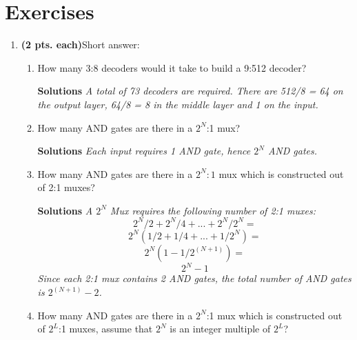 \section{Exercises}
\label{section:comboBbExercises}
\graphicspath{ {./chapter04/FigHw} }

\begin{enumerate}
    \item \textbf{(2 pts. each)}Short answer:
        \begin{enumerate}
            \item How many 3:8 decoders would it take to build a 9:512 decoder?

                \begin{onlysolution} \textbf{Solutions} \itshape{A total of 73 decoders are required.  There
                        are 512/8 = 64 on
                    the output layer, 64/8 = 8 in the middle layer and 1 on the input.}
                \end{onlysolution}
            \item How many AND gates are there in a $2^N$:1 mux?

                \begin{onlysolution} \textbf{Solutions} \itshape{ Each input requires 1 AND gate, hence $2^N$
                    AND gates.}
                \end{onlysolution}
            \item How many AND gates are there in a $2^N:1$ mux which is
                constructed out of 2:1 muxes?

                \begin{onlysolution} \textbf{Solutions} \itshape{ A $2^N$ Mux requires the following number
                        of 2:1 muxes:
                        $$ 2^N/2 + 2^N/4 + ... + 2^N/2^N = $$
                        $$ 2^N(1/2 + 1/4 + ... + 1/2^N) = $$
                        $$ 2^N(1-1/2^(N+1)) =  $$
                        $$ 2^N - 1  $$
                        Since each 2:1 mux contains 2 AND gates, the total number of AND gates is
                        $2^(N+1) - 2$.
                    }
                \end{onlysolution}

            \item How many AND gates are there in a $2^N$:1 mux which is
                constructed out of $2^L$:1 muxes, assume that
                $2^N$ is an integer multiple of $2^L$?


\end{enumerate}
\end{enumerate}
